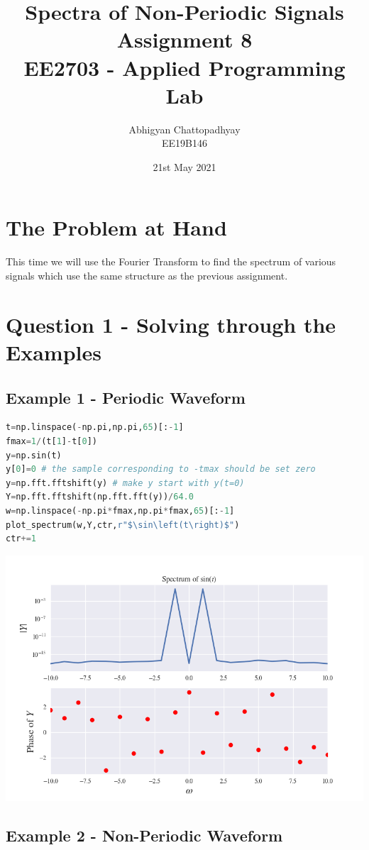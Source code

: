 \documentclass[12pt]{article}
\title{\vspace{-1cm}Spectra of Non-Periodic Signals\\
\large Assignment 8\\
\large EE2703 - Applied Programming Lab}
\author{Abhigyan Chattopadhyay \\
EE19B146}
\date{21st May 2021}
\begin{document}
\maketitle
\tableofcontents
\pagebreak
\section{The Problem at Hand}
This time we will use the Fourier Transform to find the spectrum of various signals which use the same structure as the previous assignment.

\section{Question 1 - Solving through the Examples}

\subsection{Example 1 - Periodic Waveform}

\begin{lstlisting}[language=python]
t=np.linspace(-np.pi,np.pi,65)[:-1]
fmax=1/(t[1]-t[0])
y=np.sin(t)
y[0]=0 # the sample corresponding to -tmax should be set zero
y=np.fft.fftshift(y) # make y start with y(t=0)
Y=np.fft.fftshift(np.fft.fft(y))/64.0
w=np.linspace(-np.pi*fmax,np.pi*fmax,65)[:-1]
plot_spectrum(w,Y,ctr,r"$\sin\left(t\right)$")
ctr+=1
\end{lstlisting}

\begin{center}
    \includegraphics[scale=0.8]{images/fig1.png}
\end{center}
\pagebreak
\subsection{Example 2 - Non-Periodic Waveform}
\end{document}
